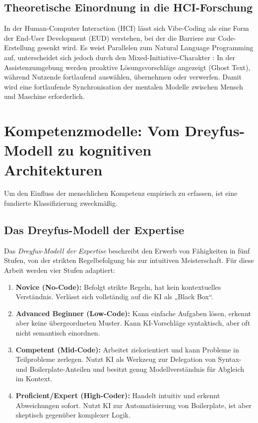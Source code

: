 \subsection{Theoretische Einordnung in die HCI-Forschung}
In der Human-Computer Interaction (HCI) lässt sich Vibe-Coding als eine Form der End-User Development (EUD) verstehen, bei der die Barriere zur Code-Erstellung gesenkt wird. Es weist Parallelen zum Natural Language Programming auf, unterscheidet sich jedoch durch den Mixed-Initiative-Charakter \parencite{horvitz1999mixed}: In der Assistenzumgebung werden proaktive Lösungsvorschläge angezeigt (Ghost Text), während Nutzende fortlaufend auswählen, übernehmen oder verwerfen. Damit wird eine fortlaufende Synchronisation der mentalen Modelle zwischen Mensch und Maschine erforderlich.

\section{Kompetenzmodelle: Vom Dreyfus-Modell zu kognitiven Architekturen}
\label{sec:competence-models}

Um den Einfluss der menschlichen Kompetenz empirisch zu erfassen, ist eine fundierte Klassifizierung zweckmäßig.

\subsection{Das Dreyfus-Modell der Expertise}
Das \emph{Dreyfus-Modell der Expertise} \parencite{dreyfus1986mind} beschreibt den Erwerb von Fähigkeiten in fünf Stufen, von der strikten Regelbefolgung bis zur intuitiven Meisterschaft. Für diese Arbeit werden vier Stufen adaptiert:

\begin{enumerate}
    \item  \textbf{Novice (No-Code):} Befolgt strikte Regeln, hat kein kontextuelles Verständnis. Verlässt sich vollständig auf die KI als „Black Box“.
    \item  \textbf{Advanced Beginner (Low-Code):} Kann einfache Aufgaben lösen, erkennt aber keine übergeordneten Muster. Kann KI-Vorschläge syntaktisch, aber oft nicht semantisch einordnen.
    \item  \textbf{Competent (Mid-Code):} Arbeitet zielorientiert und kann Probleme in Teilprobleme zerlegen. Nutzt KI als Werkzeug zur Delegation von Syntax- und Boilerplate-Anteilen und besitzt genug Modellverständnis für Abgleich im Kontext.
    \item  \textbf{Proficient/Expert (High-Coder):} Handelt intuitiv und erkennt Abweichungen sofort. Nutzt KI zur Automatisierung von Boilerplate, ist aber skeptisch gegenüber komplexer Logik.
\end{enumerate}

